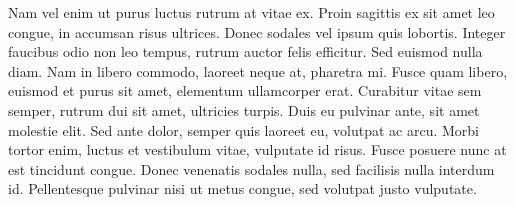 Nam vel enim ut purus luctus rutrum at vitae ex. Proin sagittis ex sit amet leo congue, in accumsan risus ultrices. Donec sodales vel ipsum quis lobortis. Integer faucibus odio non leo tempus, rutrum auctor felis efficitur. Sed euismod nulla diam. Nam in libero commodo, laoreet neque at, pharetra mi. Fusce quam libero, euismod et purus sit amet, elementum ullamcorper erat. Curabitur vitae sem semper, rutrum dui sit amet, ultricies turpis. Duis eu pulvinar ante, sit amet molestie elit. Sed ante dolor, semper quis laoreet eu, volutpat ac arcu. Morbi tortor enim, luctus et vestibulum vitae, vulputate id risus. Fusce posuere nunc at est tincidunt congue. Donec venenatis sodales nulla, sed facilisis nulla interdum id. Pellentesque pulvinar nisi ut metus congue, sed volutpat justo vulputate.
